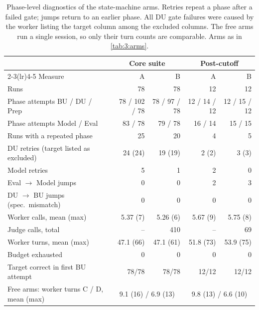 \begin{table}[htbp]
  \centering
  \small
  \caption[Phase-level diagnostics of the state-machine arms]{Phase-level diagnostics of the state-machine arms. Retries repeat a phase after a failed gate; jumps return to an earlier phase. All DU gate failures were caused by the worker listing the target column among the excluded columns. The free arms run a single session, so only their turn counts are comparable. Arms as in \autoref{tab:3:arms}.}
  \label{tab:6:phases}
  \begin{tabular}{lrrrr}
    \toprule
     & \multicolumn{2}{c}{Core suite} & \multicolumn{2}{c}{Post-cutoff} \\
    \cmidrule(lr){2-3}\cmidrule(lr){4-5}
    Measure & A & B & A & B \\
    \midrule
    Runs & 78 & 78 & 12 & 12 \\
    Phase attempts BU / DU / Prep & 78 / 102 / 78 & 78 / 97 / 78 & 12 / 14 / 12 & 12 / 15 / 12 \\
    Phase attempts Model / Eval & 83 / 78 & 79 / 78 & 16 / 14 & 15 / 15 \\
    Runs with a repeated phase & 25 & 20 & 4 & 5 \\
    \quad DU retries (target listed as excluded) & 24 (24) & 19 (19) & 2 (2) & 3 (3) \\
    \quad Model retries & 5 & 1 & 2 & 0 \\
    \quad Eval $\rightarrow$ Model jumps & 0 & 0 & 2 & 3 \\
    \quad DU $\rightarrow$ BU jumps (spec.\ mismatch) & 0 & 0 & 0 & 0 \\
    Worker calls, mean (max) & 5.37 (7) & 5.26 (6) & 5.67 (9) & 5.75 (8) \\
    Judge calls, total & -- & 410 & -- & 69 \\
    Worker turns, mean (max) & 47.1 (66) & 47.1 (61) & 51.8 (73) & 53.9 (75) \\
    Budget exhausted & 0 & 0 & 0 & 0 \\
    Target correct in first BU attempt & 78/78 & 78/78 & 12/12 & 12/12 \\
    \midrule
    Free arms: worker turns C / D, mean (max) & \multicolumn{2}{c}{9.1 (16) / 6.9 (13)} & \multicolumn{2}{c}{9.8 (13) / 6.6 (10)} \\
    \bottomrule
  \end{tabular}
\end{table}
